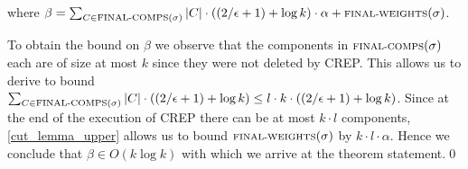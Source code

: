 \documentclass[a4paper,xcolor=dvipsnames, tikz, 12pt]{article}
\newcommand{\crep}{C{\scriptsize REP}}
\newcommand{\opt}{\text{O{\scriptsize PT}}}
\newcommand{\finalComps}{\text{\scriptsize FINAL-COMPS}}
\newcommand{\finalWeights}{\text{\scriptsize FINAL-WEIGHTS}}
\theoremstyle{definition}
\newtheorem{defi}{Definition}
\begin{document}
where $\beta=\sum_{C\in \finalComps(\sigma)}|C|\cdot((2/\epsilon+1)+\log k)\cdot\alpha+\finalWeights(\sigma)$.

To obtain the bound on $\beta$ we observe that the components in $\finalComps(\sigma)$ each are of size at most $k$ since they were not deleted by \crep{}. This allows us to derive to bound $\sum_{C\in \finalComps(\sigma)}|C|\cdot((2/\epsilon+1)+\log k)\leq l \cdot k \cdot ((2/\epsilon+1)+\log k)$. Since at the end of the execution of \crep{} there can be at most $k\cdot l$ components, \cref{cut_lemma_upper} allows us to bound $\finalWeights(\sigma)$ by $k\cdot l \cdot\alpha$. Hence we conclude that $\beta\in O(k \log k)$ with which we arrive at the theorem statement.\qed


\begin{comment}

\section{Old Analysis}
\textbf{Note:} The following analysis is mostly the same as in \cite{Avin2015}.	

	\subsection{Lower Bound on \opt{}}
	\begin{defi}
		Define the time of creation of a component $c$ managed by \crep{} as $\tau(c)$. For a non-singleton component c it is the time at which other components were merged resulting in c, if c is a singleton component $\tau(c)$ is 0 if c existed at time 0 and the last time a component containing c was deleted otherwise.
	\end{defi}
	\begin{defi}
		For a non-singleton component $c$, define
	\end{defi}
	\begin{align*}
	F(c)=\biguplus_{b\in S(c)}\times \{\tau(b)+1,...,\tau(c)\}.
	\end{align*}
	
	\begin{defi}
		A communication request between nodes x and y at time $t$ is \textit{contained} in $F(C)$ if $(x,y)\in F(c)$ and $(y,t)\in F(c)$.
	\end{defi}

	\begin{defi}
		A migration of node x performed by OPT at time t is \textit{contained} in $F(C)$ if $(x,t)\in F(c)$
	\end{defi}


\end{comment}
\end{document}
